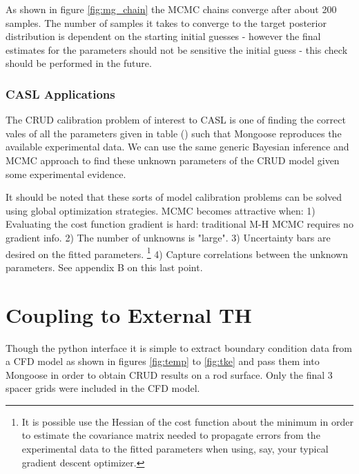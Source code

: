 \documentclass[10pt,a4paper]{report}
\begin{document}
As shown in figure \ref{fig:mg_chain} the MCMC chains converge after about 200 samples.  The number of samples it takes to converge to the target posterior distribution is dependent on the starting initial guesses - however the final estimates for the parameters should not be sensitive the initial guess - this check should be performed in the future.

\subsection{CASL Applications}

The CRUD calibration problem of interest to CASL is one of finding the correct vales of all the parameters given in table () such that Mongoose reproduces the available experimental data.
We can use the same generic Bayesian inference and MCMC approach to find these unknown parameters of the CRUD model given some experimental evidence.

It should be noted that these sorts of model calibration problems can be solved using global optimization strategies.  MCMC becomes attractive when: 1) Evaluating the cost function gradient is hard: traditional M-H MCMC requires no gradient info. 2) The number of unknowns is "large". 3) Uncertainty bars are desired on the fitted parameters. \footnote{It is possible use the Hessian of the cost function about the minimum in order to estimate the covariance matrix needed to propagate errors from the experimental data to the fitted parameters when using, say, your typical gradient descent optimizer.}
 4) Capture correlations between the unknown parameters.  See appendix B on this last point.


\chapter{Coupling to External TH}

Though the python interface it is simple to extract boundary condition data from a CFD model as shown in figures \ref{fig:temp} to \ref{fig:tke} and pass them into Mongoose in order to obtain CRUD results on a rod surface.  Only the final 3 spacer grids were included in the CFD model.
\end{document}
